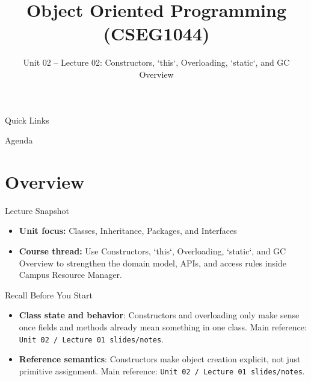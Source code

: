 \documentclass{beamer}
\title[OOPS with Java]{Object Oriented Programming (CSEG1044)}
\subtitle{Unit 02 -- Lecture 02: Constructors, `this`, Overloading, `static`, and GC Overview}
\begin{document}
\begin{frame}[fragile]
  \titlepage
  \vspace{0.5em}
  \slidesources{\OOPSUnitIISources}
\end{frame}

\begin{frame}{Quick Links}
  \centering
  \hyperlink{sec:overview}{}\hspace{0.6em}
  \hyperlink{sec:concepts}{}\hspace{0.6em}
  \hyperlink{sec:demo}{}\hspace{0.6em}
  \hyperlink{sec:summary}{}
  \slidesources{\OOPSUnitIISources}
\end{frame}

\begin{frame}{Agenda}
  \tableofcontents
  \slidesources{\OOPSUnitIISources}
\end{frame}

\section{Overview}
\label{sec:overview}

\begin{frame}{Lecture Snapshot}
\begin{itemize}[<+->]
  \item \textbf{Unit focus:} Classes, Inheritance, Packages, and Interfaces
  \item \textbf{Course thread:} Use Constructors, `this`, Overloading, `static`, and GC Overview to strengthen the domain model, APIs, and access rules inside Campus Resource Manager.
\end{itemize}
  \slidesources{\OOPSUnitIISources}
\end{frame}

\begin{frame}{Recall Before You Start}
\begin{itemize}[<+->]
  \item \textbf{Class state and behavior}: Constructors and overloading only make sense once fields and methods already mean something in one class. Main reference: \texttt{Unit 02 / Lecture 01 slides/notes}.
  \item \textbf{Reference semantics}: Constructors make object creation explicit, not just primitive assignment. Main reference: \texttt{Unit 02 / Lecture 01 slides/notes}.
\end{itemize}
  \slidesources{\OOPSUnitIISources}
\end{frame}
\end{document}
